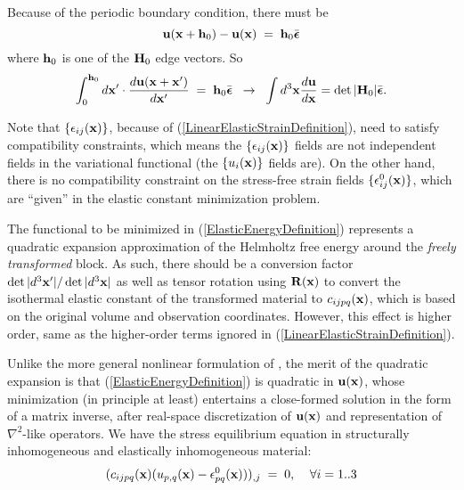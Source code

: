\documentclass[12pt]{article}
\def\bmath#1{\mbox{\boldmath$#1$}}
\begin{document}
Because of the periodic boundary condition, there must be 
\begin{equation}
 {\bf u}({\bf x}+{\bf
h}_0)-{\bf u}({\bf x}) \;=\; {\bf h}_0\bar{\bmath{\epsilon}}
\end{equation}
where ${\bf
h}_0$ is one of the ${\bf H}_0$ edge vectors.  So
\begin{equation}
 \int_0^{{\bf h}_0} d{\bf x}^\prime\cdot 
\frac{d{\bf u}({\bf x}+{\bf x}^\prime)}{d{\bf x}^\prime} 
 \;=\; 
 {\bf h}_0\bar{\bmath{\epsilon}}  \;\;\rightarrow\;\;
 \int d^3{\bf x} \frac{d{\bf u}}{d{\bf x}} =  \det|{\bf H}_0| 
 \bar{\bmath{\epsilon}}.
\end{equation}

Note that $\{\epsilon_{ij}({\bf x})\}$, because of
(\ref{LinearElasticStrainDefinition}), need to satisfy compatibility
constraints, which means the $\{\epsilon_{ij}({\bf x})\}$ fields are
not independent fields in the variational functional (the $\{u_i({\bf
x})\}$ fields are). On the other hand, there is no compatibility
constraint \cite{Jagla07} on the stress-free strain fields
$\{\epsilon^0_{ij}({\bf x})\}$, which are ``given'' in the elastic
constant minimization problem.

The functional to be minimized in (\ref{ElasticEnergyDefinition})
represents a quadratic expansion approximation of the Helmholtz free
energy \cite{LiPhDThesis00} around the {\em freely transformed} block.
As such, there should be a conversion factor $\det|d^3{\bf
x}^\prime|/\det|d^3{\bf x}|$ as well as tensor rotation using ${\bf
R}({\bf x})$ to convert the isothermal elastic constant of the
transformed material to $c_{ijpq}({\bf x})$, which is based on the
original volume and observation coordinates.  However, this effect is
higher order, same as the higher-order terms ignored in
(\ref{LinearElasticStrainDefinition}).

Unlike the more general nonlinear formulation of \cite{Jagla07}, the
merit of the quadratic expansion is that
(\ref{ElasticEnergyDefinition}) is quadratic in ${\bf u}({\bf x})$,
whose minimization (in principle at least) entertains a close-formed
solution in the form of a matrix inverse, after real-space
discretization of ${\bf u}({\bf x})$ and representation of
$\nabla^2$-like operators. We have the stress equilibrium equation in
structurally inhomogeneous and elastically inhomogeneous material:
\begin{equation}
 ( c_{ijpq}({\bf x}) 
  ( u_{p,q}({\bf x}) - \epsilon^0_{pq}({\bf x}) ))_{,j} \;=\; 0, 
  \;\;\;\;
  \forall i=1..3
 \label{StressEquilibrium}
\end{equation}
\end{document}
